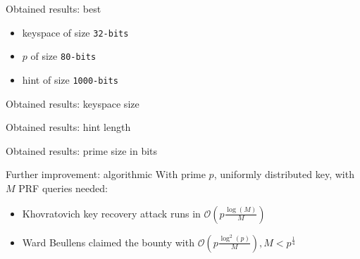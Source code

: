 \documentclass{beamer}
\theoremstyle{definition}
\theoremstyle{remark}
\renewcommand{\O}{\mathcal{O}}
\begin{document}
\begin{frame}{Obtained results: best}
\begin{itemize}
\item keyspace of size \texttt{32-bits}
\item $p$ of size \texttt{80-bits}
\item hint of size \texttt{1000-bits}
\end{itemize} 
\end{frame}
\begin{frame}{Obtained results: keyspace size}

\end{frame}
\begin{frame}{Obtained results: hint length}

\end{frame}
\begin{frame}{Obtained results: prime size in bits}

\end{frame}
\begin{frame}{Further improvement: algorithmic}
With prime $p$, uniformly distributed key, with $M$ PRF queries needed:
\bigskip
\begin{itemize}
\item Khovratovich key recovery attack runs in $\O(p\frac{\log(M)}{M})$
\medskip
\item Ward Beullens claimed the bounty with $\O(p\frac{\log^2(p)}{M}), M<p^\frac14$
\end{itemize}
\end{frame}
\end{document}
